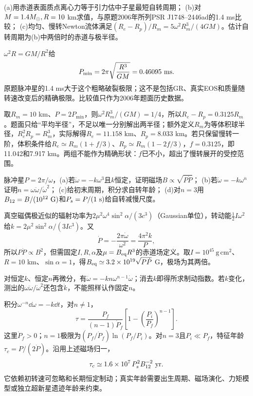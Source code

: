 \begin{exercise}
(a)用赤道表面质点离心力等于引力估中子星最短自转周期；
(b)对$M=1.4M_{\odot},R=10$ km求值，与原题2006年所列PSR J1748--2446ad的1.4 ms比较；
(c)均匀、慢转Newton流体满足$(R_e-R_p)/R_m=5\omega^2R_m^3/(4GM)$。估计自转周期为(b)中两倍时的赤道与极半径。
\end{exercise}
\begin{solution}
$\omega^2R=GM/R^2$给
\[
 P_{\min}=2\pi\sqrt{\frac{R^3}{GM}}=0.46095\ {\rm ms}.
\]
原题脉冲星的1.4 ms大于这个粗略破裂极限；这不是包括GR、真实EOS和质量随转速改变后的精确极限。比较值只作为2006年题面历史数据。

取$R_m=10$ km、$P=2P_{\min}$，则$\omega^2R_m^3/(GM)=1/4$，所以$R_e-R_p=0.3125R_m$。题面只给“平均半径”，不足以唯一分别解出两半径；额外定义$R_m$为等体积球半径，$R_e^2R_p=R_m^3$，实际解得$R_e=11.158$ km、$R_p=8.033$ km。若只保留慢转一阶，体积条件给$R_e\simeq R_m(1+f/3)$、$R_p\simeq R_m(1-2f/3)$，$f=0.3125$，即11.042和7.917 km。两组不能作为精确形状：$f$已不小，超出了慢转展开的受控范围。
\end{solution}

\begin{exercise}
脉冲星$P=2\pi/\omega$，(a)若$\dot\omega=-k\omega^3$且$k$恒定，证明磁场$B\propto\sqrt{P\dot P}$；
(b)若$\dot\omega=-k\omega^n$证明$n=\omega\ddot\omega/\dot\omega^2$；
(c)给初末周期，积分求自转年龄；
(d)对$n=3$用$B_{12}=B/(10^{12}\ {\rm G})$和$P_s=P/(1\ {\rm s})$给自转减慢尺度。
\end{exercise}
\begin{solution}
真空磁偶极近似的辐射功率为$2\mu^2\omega^4\sin^2\alpha/(3c^3)$（Gaussian单位），转动能$\tfrac12I\omega^2$给$k=2\mu^2\sin^2\alpha/(3Ic^3)$。又
\[
 \dot P=-\frac{2\pi\dot\omega}{\omega^2}
 =\frac{4\pi^2k}{P},
\]
所以$P\dot P\propto B^2$，但需固定$I,R,\alpha$及$\mu=B_{\rm eq}R^3$的赤道场定义。取$I=10^{45}\ \mathrm{g\,cm^2}$、$R=10$ km、$\sin\alpha=1$，得$B_{\rm eq}\simeq3.2\times10^{19}\sqrt{P\dot P}$ G，极场为其两倍。

对恒定$k$、恒定$n$再微分，有$\ddot\omega=-kn\omega^{n-1}\dot\omega$；消去$k$即得所求制动指数。若$k$变化，测出的$\omega\ddot\omega/\dot\omega^2$还包含$\dot k$，不能照样认作固定$n$。

积分$\omega^{-n}\dd\omega=-k\dd t$，对$n\ne1$，
\[
 \tau=\frac{P_f}{(n-1)\dot P_f}
 \left[1-\left(\frac{P_i}{P_f}\right)^{n-1}\right].
\]
这里$\dot P_f>0$；$n=1$极限为$(P_f/\dot P_f)\ln(P_f/P_i)$。对$n=3$且$P_i\ll P_f$，特征年龄$\tau_c=P/(2\dot P)$。沿用上述磁场归一，
\[
 \tau_c\simeq1.6\times10^7\,P_s^2B_{12}^{-2}\ {\rm yr}.
\]
它依赖初转速可忽略和长期恒定制动；真实年龄需要出生周期、磁场演化、力矩模型或独立超新星遗迹年龄来约束。
\end{solution}

